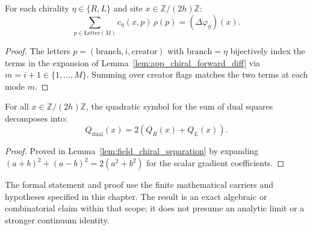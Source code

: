 \begin{lemma}
\label{lem:app_chiral_gradient_representation}
For each chirality $\eta \in \{R, L\}$ and site $x \in \mathbb{Z}/(2h)\mathbb{Z}$:
\begin{equation}
\sum_{p \in \mathrm{Letter}(M)} c_\eta(x, p)\, \rho(p) = (\Delta \varphi_\eta)(x).
\end{equation}
\end{lemma}

\begin{proof}
The letters $p = (\mathrm{branch}, i, \mathrm{creator})$ with $\mathrm{branch} = \eta$ bijectively index the terms in the expansion of Lemma~\ref{lem:app_chiral_forward_diff} via $m = i + 1 \in \{1, \dots, M\}$. Summing over creator flags matches the two terms at each mode $m$.
\end{proof}

\begin{lemma}
\label{lem:app_dual_square_chiral_decomposition}
For all $x \in \mathbb{Z}/(2h)\mathbb{Z}$, the quadratic symbol for the sum of dual squares decomposes into:
\begin{equation}
Q_{\mathrm{dual}}(x) = 2 \left( Q_R(x) + Q_L(x) \right).
\end{equation}
\end{lemma}

\begin{proof}
Proved in Lemma~\ref{lem:field_chiral_separation} by expanding $(a+b)^2 + (a-b)^2 = 2(a^2 + b^2)$ for the scalar gradient coefficients.
\end{proof}

\begin{remark}
The formal statement and proof use the finite mathematical carriers and hypotheses specified in this chapter. The result is an exact algebraic or combinatorial claim within that scope; it does not presume an analytic limit or a stronger continuum identity.
\end{remark}
